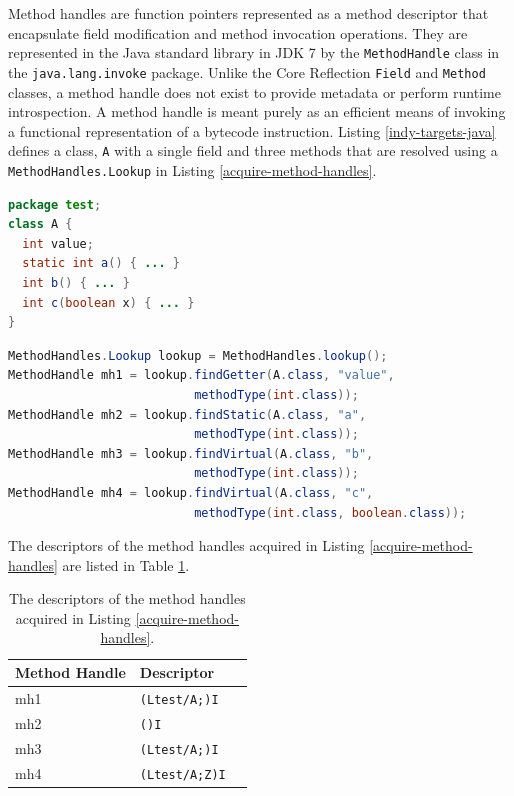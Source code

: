 Method handles are function pointers represented as a method descriptor that encapsulate field modification and method invocation operations.  They are represented in the Java standard library in JDK 7 by the \texttt{MethodHandle} class in the \texttt{java.lang.invoke} package.  Unlike the Core Reflection \texttt{Field} and \texttt{Method} classes, a method handle does not exist to provide metadata or perform runtime introspection.  A method handle is meant purely as an efficient means of invoking a functional representation of a bytecode instruction.  Listing \ref{indy-targets-java} defines a class, \texttt{A} with a single field and three methods that are resolved using a \texttt{MethodHandles.Lookup} in Listing \ref{acquire-method-handles}.

\begin{lstlisting}[language=Java,caption=Java field and method lookup targets,label=indy-targets-java]
package test;
class A {
  int value;
  static int a() { ... }
  int b() { ... }
  int c(boolean x) { ... }
}
\end{lstlisting}
\vspace{4em}
\begin{lstlisting}[language=Java,caption=Reflective lookup using \texttt{MethodHandles.Lookup},label=acquire-method-handles]
MethodHandles.Lookup lookup = MethodHandles.lookup();
MethodHandle mh1 = lookup.findGetter(A.class, "value",
                          methodType(int.class));
MethodHandle mh2 = lookup.findStatic(A.class, "a",
                          methodType(int.class));
MethodHandle mh3 = lookup.findVirtual(A.class, "b",
                          methodType(int.class));
MethodHandle mh4 = lookup.findVirtual(A.class, "c",
                          methodType(int.class, boolean.class));
\end{lstlisting}

The descriptors of the method handles acquired in Listing \ref{acquire-method-handles} are listed in Table \ref{table:acquire-method-handles-descriptors}.

\begin{table}[htbp]
  \centering
  \begin{tabular}{ | l | l | p{5cm} |}
  \hline
  \textbf{Method Handle} & \textbf{Descriptor} \\ \hline
  mh1 & \texttt{(Ltest/A;)I} \\ \hline
  mh2 & \texttt{()I} \\ \hline
  mh3 & \texttt{(Ltest/A;)I} \\ \hline
  mh4 & \texttt{(Ltest/A;Z)I} \\ \hline
  \end{tabular}
  \caption[Method Handle Descriptors]{The descriptors of the method handles acquired in Listing \ref{acquire-method-handles}.}
  \label{table:acquire-method-handles-descriptors}
\end{table}

